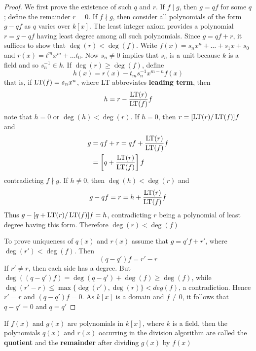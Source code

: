 \documentclass[11pt]{article}
\begin{document}
\begin{proof}
We first prove the existence of such \(q\) and \(r\). If \(f\mid g\), then
\(g=qf\) for some \(q\); define the remainder \(r=0\). If \(f\nmid g\), then
consider all polynomials of the form \(g-qf\) as \(q\) varies over \(k[x]\). The
least integer axiom provides a polynomial \(r=g-qf\) having least degree
among all such polynomials. Since \(g=qf+r\), it suffices to show that
\(\deg(r)<\deg(f)\). Write \(f(x)=s_nx^n+\dots+s_1x+s_0\) and
\(r(x)=t^mx^m+\dots t_0\). Now \(s_n\neq 0\) implies that \(s_n\) is a unit
because \(k\) is a field and so \(s_n^{-1}\in k\). If \(\deg(r)\ge\deg(f)\), define
\begin{equation*}
h(x)=r(x)-t_ms_n^{-1}x^{m-n}f(x)
\end{equation*}
that is, if \(\operatorname{LT}(f)=s_nx^n\), where LT abbreviates \textbf{leading term}, then
\begin{equation*}
h=r-\frac{\operatorname{LT}(r)}{\operatorname{LT}(f)}f
\end{equation*}
note that \(h=0\) or \(\deg(h)<\deg(r)\). If \(h=0\), then \(r=[\operatorname{LT}(r)/\operatorname{LT}(f)]f\)
and
\begin{align*}
g&=qf+r=qf+\frac{\operatorname{LT}(r)}{\operatorname{LT}(f)}f\\
&=\left[q+\frac{\operatorname{LT}(r)}{\operatorname{LT}(f)}\right]f
\end{align*}
contradicting \(f\nmid g\). If \(h\neq0\), then \(\deg(h)<\deg(r)\) and
\begin{equation*}
g-qf=r=h+\frac{\operatorname{LT}(r)}{\operatorname{LT}(f)}f
\end{equation*}
Thus \(g-[q+\operatorname{LT}(r)/\operatorname{LT}(f)]f=h\), contradicting \(r\) being a polynomial of least
degree having this form. Therefore \(\deg(r)<\deg(f)\)

To prove uniqueness of \(q(x)\) and \(r(x)\) assume that \(g=q'f+r'\), where
\(\deg(r')<\deg(f)\). Then
\begin{equation*}
(q-q')f=r'-r
\end{equation*}
If \(r'\neq r\), then each side has a degree. But
\(\deg((q-q')f)=\deg(q-q')+\deg(f)\ge\deg(f)\), while
\(\deg(r'-r)\le\max\{\deg(r'),\deg(r)\}<deg(f)\), a contradiction. Hence
\(r'=r\) and \((q-q')f=0\). As \(k[x]\) is a domain and \(f\neq 0\), it follows that
\(q-q'=0\) and \(q=q'\)
\end{proof}

\begin{definition}[]
If \(f(x)\) and \(g(x)\) are polynomials in \(k[x]\), where \(k\) is a field, then
the polynomials \(q(x)\) and \(r(x)\) occurring in the division algorithm are
called the \textbf{quotient} and the \textbf{remainder} after dividing \(g(x)\) by \(f(x)\)
\end{definition}
\end{document}
